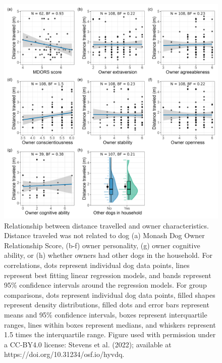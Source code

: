 \documentclass[
  pub,floatsintext]{apa6}
\begin{document}
\begin{figure}

{\centering \includegraphics[width=0.95\linewidth]{figures/owner_characteristics} 

}

\caption{Relationship between distance travelled and owner characteristics. Distance traveled was not related to dog (a) Monash Dog Owner Relationship Score, (b-f) owner personality, (g) owner cognitive ability, or (h) whether owners had other dogs in the household. For correlations, dots represent individual dog data points, lines represent best fitting linear regression models, and bands represent 95\% confidence intervals around the regression models. For group comparisons, dots represent individual dog data points, filled shapes represent density distributions, filled dots and error bars represent means and 95\% confidence intervals, boxes represent interquartile ranges, lines within boxes represent medians, and whiskers represent 1.5 times the interquartile range.  Figure used with permission under a CC-BY4.0 license: Stevens et al. (2022); available at https://doi.org/10.31234/osf.io/hyvdq.}\label{fig:owner-char}
\end{figure}
\end{document}
